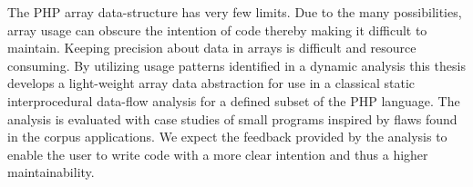 
The PHP array data-structure has very few limits. Due to the many possibilities, array usage can obscure the intention of code thereby making it difficult to maintain. Keeping precision about data in arrays is difficult and resource consuming. By utilizing usage patterns identified in a dynamic analysis this thesis develops a light-weight array data abstraction for use in a classical static interprocedural data-flow analysis for a defined subset of the PHP language. The analysis is evaluated with case studies of small programs inspired by flaws found in the corpus applications. We expect the feedback provided by the analysis to enable the user to write code with a more clear intention and thus a higher maintainability.

\begin{comment}
Writing code with a clear intention and high maintainability is important for any development project. For the PHP language the many possibilities of the array data-structure can easily hinder those important properties. Even if PHP arrays have endless possible use cases, does the practical uses not exhibit detectable patterns? This thesis aims to answer that question with a dynamical analysis of a corpus of popular PHP applications. Using the patterns identified in the dynamical analysis a data abstraction is developed for use in a classical static interprocedural data-flow analysis for a defined subset of the PHP language. The analysis is evaluated with case studies of small programs inspired by flaws found in the corpus applications. The case studies show how the analysis can provide feedback for the user when code is produced that might hinder the clarity of intention or maintainability.
\end{comment}
